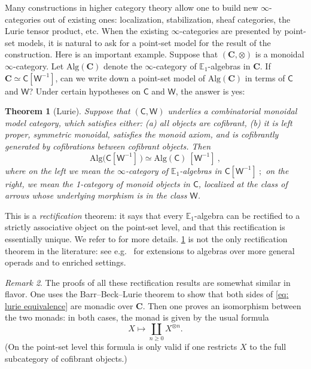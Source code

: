 \documentclass[a4paper,12pt]{amsart}
\theoremstyle{plain}
\newtheorem{theorem}{Theorem}[section]
\theoremstyle{definition}
\theoremstyle{remark}
\newtheorem{remark}[theorem]{\sc Remark}%
\begin{document}
Many constructions in higher category theory allow one to build new $\infty$-categories out of existing ones: localization, stabilization, sheaf categories, the Lurie tensor product, etc. When the existing $\infty$-categories are presented by point-set models, it is natural to ask for a point-set model for the result of the construction. Here is an important example. Suppose that $(\mathbf C, \otimes)$ is a {monoidal} $\infty$-category. Let $\mathrm{Alg}(\mathbf C)$ denote the $\infty$-category of $\mathbb E_1$-algebras in $\mathbf C$. If $\mathbf C \simeq \mathsf C[\mathsf W^{-1}]$, can we write down a point-set model of $\mathrm{Alg}(\mathbf C)$ in terms of $\mathsf C$ and $\mathsf W$? Under certain hypotheses on $\mathsf C$ and $\mathsf W$, the answer is yes:

\begin{theorem}[Lurie] \label{lurie theorem} Suppose that $(\mathsf C,\mathsf W)$ underlies a combinatorial monoidal model category, which satisfies either: (a) all objects are cofibrant, (b) it is left proper, symmetric monoidal, satisfies the monoid axiom, and is cofibrantly generated by cofibrations between cofibrant objects. Then
	\begin{equation}
	    \label{eq: lurie equivalence}\mathrm{Alg}\big(\mathsf C[\mathsf W^{-1}]\, \big) \simeq \mathrm{Alg}(\mathsf C)~[\mathsf W^{-1}]~,
	\end{equation} 
	where on the left we mean the $\infty$-category of $\mathbb E_1$-algebras in $\mathsf C[\mathsf W^{-1}]~;$ on the right, we mean the 1-category of monoid objects in $\mathsf C$, localized at the class of arrows whose underlying morphism is in the class $\mathsf W$. 	
\end{theorem}


This is a \emph{rectification} theorem: it says that every $\mathbb E_1$-algebra can be rectified to a strictly associative object on the point-set level, and that this rectification is essentially unique. We refer to \cite[Section 4.1.8]{HigherAlgebra} for more details. \cref{lurie theorem} is not the only rectification theorem in the literature: see e.g.\ \cite{haugseng-rectification,HinichRectification,PavlovScholbach18} for extensions to algebras over more general operads and to enriched settings. 

\begin{remark}\label{strategy remark}
    The proofs of all these rectification results are somewhat similar in flavor. One uses the Barr--Beck--Lurie theorem to show that both sides of \eqref{eq: lurie equivalence} are monadic over $\mathbf C$. Then one proves an isomorphism between the two monads: in both cases, the monad is given by the usual formula
\begin{equation}\label{classical free algebra} X \mapsto \coprod_{n \geq 0} X^{\otimes n}.\end{equation}
(On the point-set level this formula is only valid if one restricts $X$ to the full subcategory of cofibrant objects.)
\end{remark}
\end{document}
